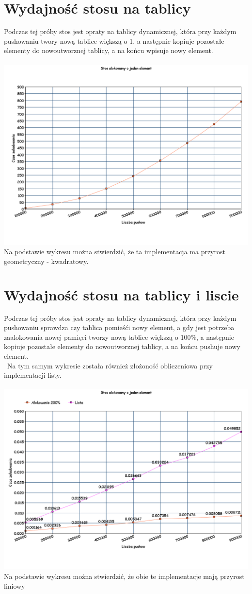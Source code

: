 \documentclass[11pt]{article}
\begin{document}
\section{Wydajność stosu na tablicy}
Podczas tej próby stos jest opraty na tablicy dynamicznej, która przy każdym pushowaniu twory nową tablice większą o 1, a następnie kopiuje pozostałe elementy do nowoutworznej tablicy, a na końcu wpisuje nowy element.\\\
\includegraphics[width=6.5in]{3stos_dyn_o_1.png}
Na podstawie wykresu można stwierdzić, że ta implementacja ma przyrost geometryczny - kwadratowy.
\section{Wydajność stosu na tablicy i liscie}
Podczas tej próby stos jest opraty na tablicy dynamicznej, która przy każdym pushowaniu sprawdza czy tablica pomieśći nowy element, a gdy jest potrzeba zaalokowania nowej pamięci tworzy nową tablice większą o 100\%, a następnie kopiuje pozostałe elementy do nowoutworznej tablicy, a na końcu pushuje nowy element.\\\
Na tym samym wykresie została również złożoność obliczeniowa przy implementacji listy.\\\
\includegraphics[width=6.5in]{3stos_dyn_o_200ilista.png}
Na podstawie wykresu można stwierdzić, że obie te implementacje mają przyrost liniowy
\end{document}
